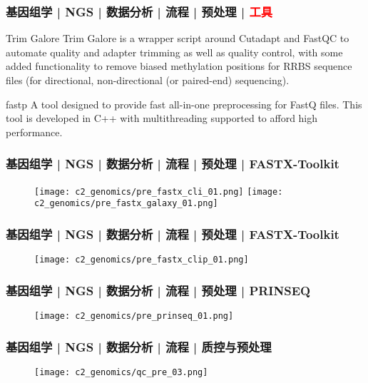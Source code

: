 \begin{frame}
  \frametitle{基因组学 | NGS | 数据分析 | 流程 | 预处理 | \textcolor{red}{工具}}
  \begin{block}{Trim Galore}
    Trim Galore is a wrapper script around Cutadapt and FastQC to automate quality and adapter trimming as well as quality control, with some added functionality to remove biased methylation positions for RRBS sequence files (for directional, non-directional (or paired-end) sequencing).
  \end{block}
  \pause
  \begin{block}{fastp}
A tool designed to provide fast all-in-one preprocessing for FastQ files. This tool is developed in C++ with multithreading supported to afford high performance.
  \end{block}
\end{frame}

\begin{frame}
  \frametitle{基因组学 | NGS | 数据分析 | 流程 | 预处理 | FASTX-Toolkit}
  \begin{figure}
    \centering
    \texttt{[image: c2\_genomics/pre\_fastx\_cli\_01.png]}
    \texttt{[image: c2\_genomics/pre\_fastx\_galaxy\_01.png]}
  \end{figure}
\end{frame}

\begin{frame}
  \frametitle{基因组学 | NGS | 数据分析 | 流程 | 预处理 | FASTX-Toolkit}
  \begin{figure}
    \centering
    \texttt{[image: c2\_genomics/pre\_fastx\_clip\_01.png]}
  \end{figure}
\end{frame}

\begin{frame}
  \frametitle{基因组学 | NGS | 数据分析 | 流程 | 预处理 | PRINSEQ}
  \begin{figure}
    \centering
    \texttt{[image: c2\_genomics/pre\_prinseq\_01.png]}
  \end{figure}
\end{frame}

\begin{frame}
  \frametitle{基因组学 | NGS | 数据分析 | 流程 | 质控与预处理}
  \begin{figure}
    \centering
    \texttt{[image: c2\_genomics/qc\_pre\_03.png]}
  \end{figure}
\end{frame}

